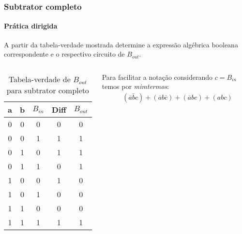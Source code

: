 \begin{frame}
	\frametitle{Subtrator completo}
	\framesubtitle{\textbf{Prática dirigida}}
	\par A partir da tabela-verdade mostrada determine a expressão algébrica booleana correspondente e o respectivo circuito de $B_{out}$.
	
	\begin{columns}
		\begin{table}[h!]
			\centering
			\begin{tabular}{|c|c|c|c|c|}
				\hline
				a & b & $B_{in}$ & Diff & $B_{out}$ \\
				\hline
				0 & 0 & 0 & 0 & 0 \\
				0 & 0 & 1 & 1 & 1 \\
				0 & 1 & 0 & 1 & 1 \\
				0 & 1 & 1 & 0 & 1 \\
				1 & 0 & 0 & 1 & 0 \\
				1 & 0 & 1 & 0 & 0 \\
				1 & 1 & 0 & 0 & 0 \\
				1 & 1 & 1 & 1 & 1 \\
				\hline
			\end{tabular}
			\caption{Tabela-verdade de $B_{out}$ para subtrator completo}
			\label{tab:barroe_out2}
		\end{table}
			\par Para facilitar a notação considerando $c=B_{in}$ temos por \textit{mimtermos}:
			\begin{equation}
				\begin{aligned}
					&(\overline{a}\overline{b}c)+(\overline{a}b\overline{c})+(\overline{a}bc)+(abc)
				\end{aligned}
			\end{equation}
	\end{columns}
\end{frame}


